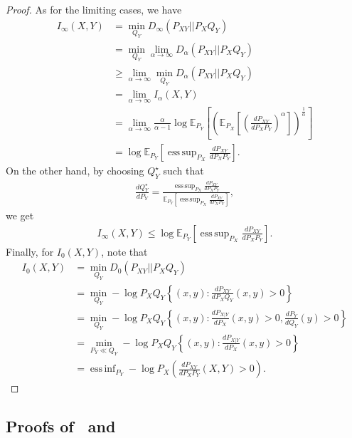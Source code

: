 \documentclass{article}
\numberwithin{theorem}{section}
\numberwithin{example}{section}
\numberwithin{remark}{section}
\numberwithin{definition}{section}
\newcommand{\E}{\mathbb{E}}
\DeclareMathOperator*{\esssup}{ess\,sup}
\DeclareMathOperator*{\essinf}{ess\,inf}
\begin{document}
\begin{proof}
    As for the limiting cases, we have
    \begin{align}
        I_\infty(X,Y) & = \min_{Q_Y} D_\infty(P_{XY} || P_X Q_Y) \\
        & = \min_{Q_Y} \lim_{\alpha \to \infty}  D_\alpha (P_{XY}|| P_X Q_Y) \\
        & \geq \lim_{\alpha \to \infty} \min_{Q_Y} D_\alpha (P_{XY}|| P_X Q_Y) \\
        & = \lim_{\alpha \to \infty} I_\alpha(X,Y) \\
        & = \lim_{\alpha \to \infty} \frac{\alpha}{\alpha-1} \log \E_{P_Y} \left[\left(\E_{P_X}\left[\left(\frac{dP_{XY}}{dP_XP_Y}\right)^\alpha\right]\right)^\frac{1}{\alpha}\right] \\
       & =  \log \E_{P_Y} \left[  \esssup_{P_X}  \frac{dP_{XY}}{dP_XP_Y} \right].
    \end{align}
    On the other hand, by choosing $Q^\star_Y$ such that
    \begin{align}
        \frac{d Q^\star_Y}{dP_Y} = \frac{  \esssup_{P_X}  \frac{dP_{XY}}{dP_XP_Y}} {\E_{P_Y} \left[  \esssup_{P_X}  \frac{dP_{XY}}{dP_XP_Y} \right]},
    \end{align}
    we get
    \begin{align}
        I_\infty(X,Y) \leq \log \E_{P_Y} \left[  \esssup_{P_X}  \frac{dP_{XY}}{dP_XP_Y} \right].
    \end{align}
    Finally, for $I_0(X,Y)$, note that
    \begin{align}
        I_0(X,Y) & = \min_{Q_Y} D_0(P_{XY} || P_XQ_Y) \\
        & = \min_{Q_Y} - \log P_XQ_Y \left\lbrace (x,y): \frac{dP_{XY}}{dP_XQ_Y}(x,y) > 0 \right\rbrace \\
        & = \min_{Q_Y} - \log P_XQ_Y \left\lbrace (x,y): \frac{dP_{X|Y}}{dP_X}(x,y) > 0, \frac{dP_Y}{dQ_Y}(y)>0 \right\rbrace \\
        & = \min_{ P_Y \ll Q_Y} - \log P_XQ_Y \left\lbrace (x,y): \frac{dP_{X|Y}}{dP_X}(x,y) > 0 \right\rbrace \\
        & = \essinf_{P_Y} -  \log P_X \left( \frac{dP_{XY}}{dP_XP_Y}(X,Y) > 0  \right).
    \end{align}
    \end{proof}

\subsection{Proofs of~ and~}\label{app:l0normProof}
\end{document}
